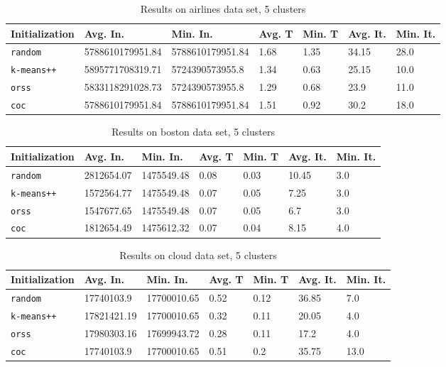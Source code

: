 \begin{table}[p]
	\begin{center}
		\begin{tabular}{|l|l|l|l|l|l|l|}
			\hline
			Initialization & Avg. In. & Min. In. & Avg. T & Min. T & Avg. It. & Min. It.\\\hline
			\texttt{random} & 5788610179951.84 & 5788610179951.84 & 1.68 & 1.35 & 34.15 & 28.0\\\hline
			\texttt{k-means++} & 5895771708319.71 & 5724390573955.8 & 1.34 & 0.63 & 25.15 & 10.0\\\hline
			\texttt{orss} & 5833118291028.73 & 5724390573955.8 & 1.29 & 0.68 & 23.9 & 11.0\\\hline
			\texttt{coc} & 5788610179951.84 & 5788610179951.84 & 1.51 & 0.92 & 30.2 & 18.0\\\hline
		\end{tabular}
		\caption{Results on airlines data set, 5 clusters}
		\label{tbl:airlines5}
	\end{center}
\end{table}

\begin{table}[p]
	\begin{center}
		\begin{tabular}{|l|l|l|l|l|l|l|}
			\hline
			Initialization & Avg. In. & Min. In. & Avg. T & Min. T & Avg. It. & Min. It.\\\hline
			\texttt{random} & 2812654.07 & 1475549.48 & 0.08 & 0.03 & 10.45 & 3.0\\\hline
			\texttt{k-means++} & 1572564.77 & 1475549.48 & 0.07 & 0.05 & 7.25 & 3.0\\\hline
			\texttt{orss} & 1547677.65 & 1475549.48 & 0.07 & 0.05 & 6.7 & 3.0\\\hline
			\texttt{coc} & 1812654.49 & 1475612.32 & 0.07 & 0.04 & 8.15 & 4.0\\\hline
		\end{tabular}
		\caption{Results on boston data set, 5 clusters}
		\label{tbl:boston5}
	\end{center}
\end{table}

\begin{table}[p]
	\begin{center}
		\begin{tabular}{|l|l|l|l|l|l|l|}
			\hline
			Initialization & Avg. In. & Min. In. & Avg. T & Min. T & Avg. It. & Min. It.\\\hline
			\texttt{random} & 17740103.9 & 17700010.65 & 0.52 & 0.12 & 36.85 & 7.0\\\hline
			\texttt{k-means++} & 17821421.19 & 17700010.65 & 0.32 & 0.11 & 20.05 & 4.0\\\hline
			\texttt{orss} & 17980303.16 & 17699943.72 & 0.28 & 0.11 & 17.2 & 4.0\\\hline
			\texttt{coc} & 17740103.9 & 17700010.65 & 0.51 & 0.2 & 35.75 & 13.0\\\hline
		\end{tabular}
		\caption{Results on cloud data set, 5 clusters}
		\label{tbl:cloud5}
	\end{center}
\end{table}

